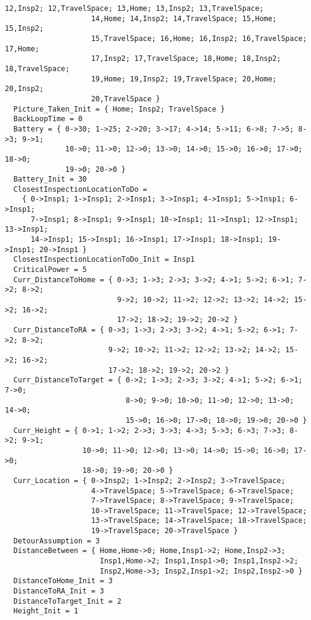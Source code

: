 \documentclass[12pt]{extarticle}
\begin{document}
\begin{lstlisting}[basicstyle=\tiny]
                    12,Insp2; 12,TravelSpace; 13,Home; 13,Insp2; 13,TravelSpace;
                    14,Home; 14,Insp2; 14,TravelSpace; 15,Home; 15,Insp2;
                    15,TravelSpace; 16,Home; 16,Insp2; 16,TravelSpace; 17,Home;
                    17,Insp2; 17,TravelSpace; 18,Home; 18,Insp2; 18,TravelSpace;
                    19,Home; 19,Insp2; 19,TravelSpace; 20,Home; 20,Insp2;
                    20,TravelSpace }
  Picture_Taken_Init = { Home; Insp2; TravelSpace }
  BackLoopTime = 0
  Battery = { 0->30; 1->25; 2->20; 3->17; 4->14; 5->11; 6->8; 7->5; 8->3; 9->1;
              10->0; 11->0; 12->0; 13->0; 14->0; 15->0; 16->0; 17->0; 18->0;
              19->0; 20->0 }
  Battery_Init = 30
  ClosestInspectionLocationToDo =
    { 0->Insp1; 1->Insp1; 2->Insp1; 3->Insp1; 4->Insp1; 5->Insp1; 6->Insp1;
      7->Insp1; 8->Insp1; 9->Insp1; 10->Insp1; 11->Insp1; 12->Insp1; 13->Insp1;
      14->Insp1; 15->Insp1; 16->Insp1; 17->Insp1; 18->Insp1; 19->Insp1; 20->Insp1 }
  ClosestInspectionLocationToDo_Init = Insp1
  CriticalPower = 5
  Curr_DistanceToHome = { 0->3; 1->3; 2->3; 3->2; 4->1; 5->2; 6->1; 7->2; 8->2;
                          9->2; 10->2; 11->2; 12->2; 13->2; 14->2; 15->2; 16->2;
                          17->2; 18->2; 19->2; 20->2 }
  Curr_DistanceToRA = { 0->3; 1->3; 2->3; 3->2; 4->1; 5->2; 6->1; 7->2; 8->2;
                        9->2; 10->2; 11->2; 12->2; 13->2; 14->2; 15->2; 16->2;
                        17->2; 18->2; 19->2; 20->2 }
  Curr_DistanceToTarget = { 0->2; 1->3; 2->3; 3->2; 4->1; 5->2; 6->1; 7->0;
                            8->0; 9->0; 10->0; 11->0; 12->0; 13->0; 14->0;
                            15->0; 16->0; 17->0; 18->0; 19->0; 20->0 }
  Curr_Height = { 0->1; 1->2; 2->3; 3->3; 4->3; 5->3; 6->3; 7->3; 8->2; 9->1;
                  10->0; 11->0; 12->0; 13->0; 14->0; 15->0; 16->0; 17->0;
                  18->0; 19->0; 20->0 }
  Curr_Location = { 0->Insp2; 1->Insp2; 2->Insp2; 3->TravelSpace;
                    4->TravelSpace; 5->TravelSpace; 6->TravelSpace;
                    7->TravelSpace; 8->TravelSpace; 9->TravelSpace;
                    10->TravelSpace; 11->TravelSpace; 12->TravelSpace;
                    13->TravelSpace; 14->TravelSpace; 18->TravelSpace;
                    19->TravelSpace; 20->TravelSpace }
  DetourAssumption = 3
  DistanceBetween = { Home,Home->0; Home,Insp1->2; Home,Insp2->3;
                      Insp1,Home->2; Insp1,Insp1->0; Insp1,Insp2->2;
                      Insp2,Home->3; Insp2,Insp1->2; Insp2,Insp2->0 }
  DistanceToHome_Init = 3
  DistanceToRA_Init = 3
  DistanceToTarget_Init = 2
  Height_Init = 1

\end{lstlisting}
\end{document}
